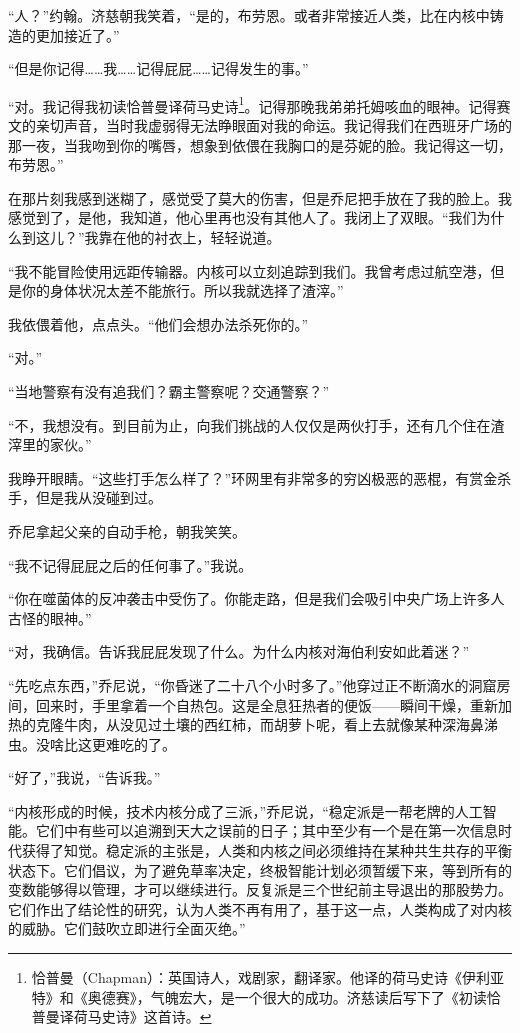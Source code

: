 \documentclass[AutoFakeBold=true]{book}
\begin{document}
``人？''约翰。济慈朝我笑着，``是的，布劳恩。或者非常接近人类，比在内核中铸造的更加接近了。''

``但是你记得……我……记得屁屁……记得发生的事。''

``对。我记得我初读恰普曼译荷马史诗\footnote{恰普曼（Chapman）：英国诗人，戏剧家，翻译家。他译的荷马史诗《伊利亚特》和《奥德赛》，气魄宏大，是一个很大的成功。济慈读后写下了《初读恰普曼译荷马史诗》这首诗。}。记得那晚我弟弟托姆咳血的眼神。记得赛文的亲切声音，当时我虚弱得无法睁眼面对我的命运。我记得我们在西班牙广场的那一夜，当我吻到你的嘴唇，想象到依偎在我胸口的是芬妮的脸。我记得这一切，布劳恩。''

在那片刻我感到迷糊了，感觉受了莫大的伤害，但是乔尼把手放在了我的脸上。我感觉到了，是他，我知道，他心里再也没有其他人了。我闭上了双眼。``我们为什么到这儿？''我靠在他的衬衣上，轻轻说道。

``我不能冒险使用远距传输器。内核可以立刻追踪到我们。我曾考虑过航空港，但是你的身体状况太差不能旅行。所以我就选择了渣滓。''

我依偎着他，点点头。``他们会想办法杀死你的。''

``对。''

``当地警察有没有追我们？霸主警察呢？交通警察？''

``不，我想没有。到目前为止，向我们挑战的人仅仅是两伙打手，还有几个住在渣滓里的家伙。''

我睁开眼睛。``这些打手怎么样了？''环网里有非常多的穷凶极恶的恶棍，有赏金杀手，但是我从没碰到过。

乔尼拿起父亲的自动手枪，朝我笑笑。

``我不记得屁屁之后的任何事了。''我说。

``你在噬菌体的反冲袭击中受伤了。你能走路，但是我们会吸引中央广场上许多人古怪的眼神。''

``对，我确信。告诉我屁屁发现了什么。为什么内核对海伯利安如此着迷？''

``先吃点东西，''乔尼说，``你昏迷了二十八个小时多了。''他穿过正不断滴水的洞窟房间，回来时，手里拿着一个自热包。这是全息狂热者的便饭——瞬间干燥，重新加热的克隆牛肉，从没见过土壤的西红柿，而胡萝卜呢，看上去就像某种深海鼻涕虫。没啥比这更难吃的了。

``好了，''我说，``告诉我。''

``内核形成的时候，技术内核分成了三派，''乔尼说，``稳定派是一帮老牌的人工智能。它们中有些可以追溯到天大之误前的日子；其中至少有一个是在第一次信息时代获得了知觉。稳定派的主张是，人类和内核之间必须维持在某种共生共存的平衡状态下。它们倡议，为了避免草率决定，终极智能计划必须暂缓下来，等到所有的变数能够得以管理，才可以继续进行。反复派是三个世纪前主导退出的那股势力。它们作出了结论性的研究，认为人类不再有用了，基于这一点，人类构成了对内核的威胁。它们鼓吹立即进行全面灭绝。''
\end{document}
